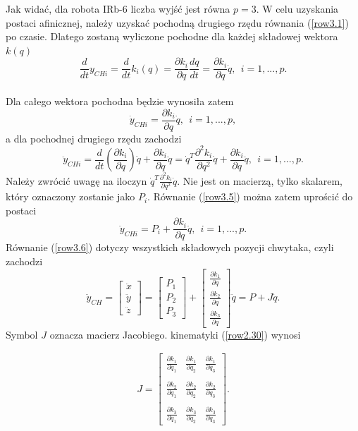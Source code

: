 \documentclass[eng,printmode]{mgr}
\begin{document}
{Jak widać, dla robota IRb-6 liczba wyjść jest równa $p=3$.
W celu uzyskania postaci afinicznej, należy uzyskać pochodną drugiego rzędu równania (\ref{row3.1}) po czasie. Dlatego zostaną wyliczone pochodne dla każdej składowej wektora $k(q)$ 
\begin{equation}
\frac{d}{dt}y_{CHi}=\frac{d}{dt}k_i(q)=\frac{∂k_i}{∂q}\frac{dq}{dt}=\frac{∂k_i}{∂q}\dot{q},\ \ i=1,...,p.
\end{equation}
\\Dla całego wektora pochodna będzie wynosiła zatem
\begin{equation}
\dot{y}_{CHi}=\frac{∂k_i}{∂q}\dot{q},\ \ i=1,...,p,
\end{equation}
a dla pochodnej drugiego rzędu zachodzi
\begin{equation}\label{row3.5}
\ddot{y}_{CHi}=\frac{d}{dt}\left(\frac{∂k_i}{∂q}\right)\dot{q}+\frac{∂k_i}{∂q}\ddot{q}=\dot{q}^T\frac{∂^2k_i}{∂q^2}\dot{q}+\frac{∂k_i}{∂q}\ddot{q},\ \ i=1,...,p.
\end{equation}
Należy zwrócić uwagę na iloczyn $\dot{q}^T\frac{∂^2k_i}{∂q^2}\dot{q}$. Nie jest on macierzą, tylko skalarem, który oznaczony zostanie jako $P_i$. Równanie (\ref{row3.5}) można zatem uprościć do postaci
\begin{equation}\label{row3.6}
\ddot{y}_{CHi}= P_i +\frac{∂k_i}{∂q}\ddot{q},\ \ i=1,...,p.
\end{equation}
Równanie (\ref{row3.6}) dotyczy wszystkich składowych pozycji chwytaka, czyli zachodzi
\begin{equation}\label{row3.7}
\ddot{y}_{CH}=\left[
        \begin{array}{c}
         \ddot{x}\\ 
       \ddot{y}\\
         \ddot{z}
         \end{array}
      \right]=\left[
        \begin{array}{c}
         P_1\\ 
        P_2\\
        P_3
         \end{array}
      \right]+\left[
        \begin{array}{c}
         \frac{∂k_1}{∂q}\\ 
      \frac{∂k_2}{∂q}\\
         \frac{∂k_3}{∂q}
         \end{array}
      \right]\ddot{q}= P+J\ddot{q}.
\end{equation}
Symbol $J$ oznacza macierz Jacobiego. kinematyki (\ref{row2.30}) wynosi

\large{\begin{eqnarray}
J=\left[
      \begin{array}{ccc}
         \frac{∂k_1}{∂q_1} & \frac{∂k_1}{∂q_2} & \frac{∂k_1}{∂q_3}\\ 
         &&\\
         \frac{∂k_2}{∂q_1} & \frac{∂k_2}{∂q_2} & \frac{∂k_2}{∂q_3}\\
         &&\\
         \frac{∂k_3}{∂q_1} & \frac{∂k_3}{∂q_2} & \frac{∂k_3}{∂q_3}
         \end{array}
      \right].\nonumber
\end{eqnarray}}}
\end{document}
